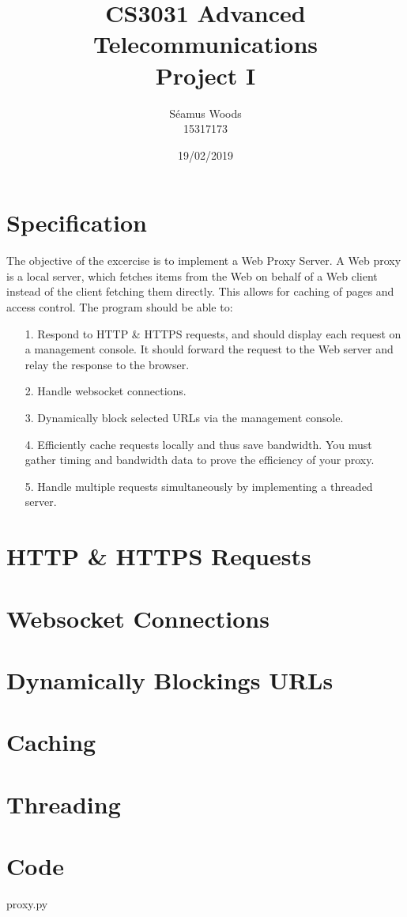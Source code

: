 \documentclass[12pt]{report}
\title{CS3031 Advanced Telecommunications \\ Project I}
\author{Séamus Woods \\ 15317173}
\date{19/02/2019}
\begin{document}
\maketitle
\newpage


\section{Specification}
The objective of the excercise is to implement a Web Proxy Server. A Web proxy is a local server, which fetches items from the Web on behalf of a Web client instead of the client fetching them directly. This allows for caching of pages and access control.
\newline
\newline
The program should be able to:
\begin{itemize}
\item[1.] Respond to HTTP \& HTTPS requests, and should display each request on a management console. It should forward the request to the Web server and relay the response to the browser.
\item[2.] Handle websocket connections.
\item[3.] Dynamically block selected URLs via the management console.
\item[4.] Efficiently cache requests locally and thus save bandwidth. You must gather timing and bandwidth data to prove the efficiency of your proxy.
\item[5.] Handle multiple requests simultaneously by implementing a threaded server. 
\end{itemize}

\section{HTTP \& HTTPS Requests}


\section{Websocket Connections}


\section{Dynamically Blockings URLs}


\section{Caching}


\section{Threading}


\section{Code}
\lstset{%
  language=Python,
  basicstyle=\footnotesize,
  showstringspaces=false,
  numbers=left,
  breakatwhitespace=false,
  breaklines=true,
  breakatwhitespace=true,
}

{proxy.py}
\end{document}
